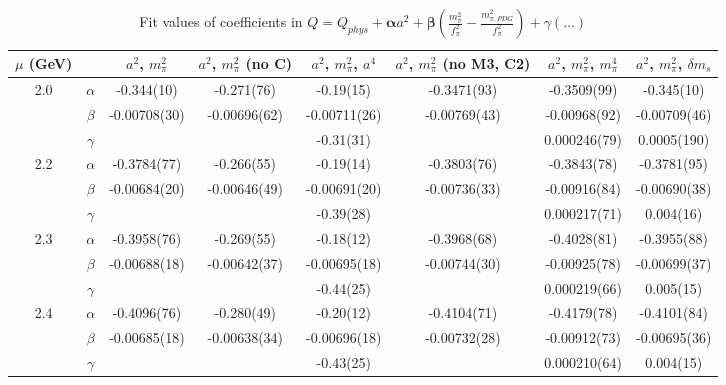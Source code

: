 \documentclass[12pt]{extarticle}
\begin{document}
\begin{table}[h!]
\begin{center}
\begin{tabular}{|c c|c|c|c|c|c|c|}
\hline
$\mu$ (GeV) &  & $a^2$, $m_\pi^2$& $a^2$, $m_\pi^2$ (no C)& $a^2$, $m_\pi^2$, $a^4$& $a^2$, $m_\pi^2$ (no M3, C2)& $a^2$, $m_\pi^2$, $m_\pi^4$& $a^2$, $m_\pi^2$, $\delta m_s$\\
\hline
\multirow{3}{0.5in}{2.0} & $\alpha$ & -0.344(10)& -0.271(76)& -0.19(15)& -0.3471(93)& -0.3509(99)& -0.345(10)\\
 & $\beta$ & -0.00708(30)& -0.00696(62)& -0.00711(26)& -0.00769(43)& -0.00968(92)& -0.00709(46)\\
 & $\gamma$ &  &  & -0.31(31)&  & 0.000246(79)& 0.0005(190)\\
\hline
\multirow{3}{0.5in}{2.2} & $\alpha$ & -0.3784(77)& -0.266(55)& -0.19(14)& -0.3803(76)& -0.3843(78)& -0.3781(95)\\
 & $\beta$ & -0.00684(20)& -0.00646(49)& -0.00691(20)& -0.00736(33)& -0.00916(84)& -0.00690(38)\\
 & $\gamma$ &  &  & -0.39(28)&  & 0.000217(71)& 0.004(16)\\
\hline
\multirow{3}{0.5in}{2.3} & $\alpha$ & -0.3958(76)& -0.269(55)& -0.18(12)& -0.3968(68)& -0.4028(81)& -0.3955(88)\\
 & $\beta$ & -0.00688(18)& -0.00642(37)& -0.00695(18)& -0.00744(30)& -0.00925(78)& -0.00699(37)\\
 & $\gamma$ &  &  & -0.44(25)&  & 0.000219(66)& 0.005(15)\\
\hline
\multirow{3}{0.5in}{2.4} & $\alpha$ & -0.4096(76)& -0.280(49)& -0.20(12)& -0.4104(71)& -0.4179(78)& -0.4101(84)\\
 & $\beta$ & -0.00685(18)& -0.00638(34)& -0.00696(18)& -0.00732(28)& -0.00912(73)& -0.00695(36)\\
 & $\gamma$ &  &  & -0.43(25)&  & 0.000210(64)& 0.004(15)\\
\hline
\end{tabular}
\caption{Fit values of coefficients in $Q = Q_{phys} + \mathbf{\alpha} a^2 + \mathbf{\beta}\left(\frac{m_\pi^2}{f_\pi^2}-\frac{m_{\pi,PDG}^2}{f_\pi^2}\right) + \gamma(\ldots)$}
\end{center}
\end{table}





\end{document}
